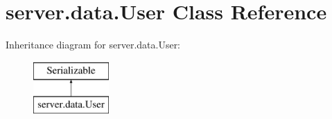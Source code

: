 \hypertarget{classserver_1_1data_1_1_user}{}\section{server.\+data.\+User Class Reference}
\label{classserver_1_1data_1_1_user}
Inheritance diagram for server.\+data.\+User\+:\begin{figure}[H]
\begin{center}
\leavevmode
\includegraphics[height=2.000000cm]{classserver_1_1data_1_1_user}
\end{center}
\end{figure}
